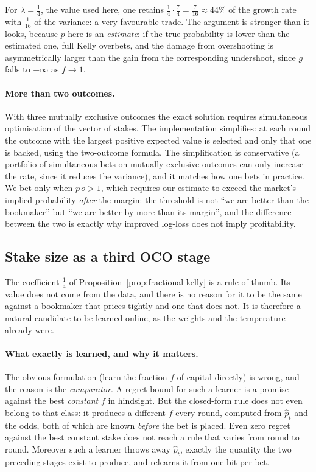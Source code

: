 \documentclass[12pt,a4paper,oneside]{report}
\renewcommand{\_}{\oldunderscore\allowbreak}
\theoremstyle{definition}
\theoremstyle{plain}
\theoremstyle{remark}
\begin{document}
For $\lambda=\tfrac14$, the value used here, one retains
$\tfrac14\cdot\tfrac74 = \tfrac{7}{16} \approx 44\%$ of the growth rate with $\tfrac{1}{16}$ of
the variance: a very favourable trade. The argument is stronger than it looks, because $p$ here
is an \emph{estimate}: if the true probability is lower than the estimated one, full Kelly
overbets, and the damage from overshooting is asymmetrically larger than the gain from the
corresponding undershoot, since $g$ falls to $-\infty$ as $f\to 1$.

\paragraph{More than two outcomes.} With three mutually exclusive outcomes the exact solution
requires simultaneous optimisation of the vector of stakes. The implementation simplifies: at
each round the outcome with the largest positive expected value is selected and only that one is
backed, using the two-outcome formula. The simplification is conservative (a portfolio of
simultaneous bets on mutually exclusive outcomes can only increase the rate, since it reduces
the variance), and it matches how one bets in practice. We bet only when $p\,o > 1$, which
requires our estimate to exceed the market's implied probability \emph{after} the margin: the
threshold is not ``we are better than the bookmaker'' but ``we are better by more than its
margin'', and the difference between the two is exactly why improved log-loss does not imply
profitability.

\subsection{Stake size as a third OCO stage}
\label{sec:oco-kelly-theory}

The coefficient $\tfrac14$ of Proposition~\ref{prop:fractional-kelly} is a rule of thumb. Its
value does not come from the data, and there is no reason for it to be the same against a
bookmaker that prices tightly and one that does not. It is therefore a natural candidate to be
learned online, as the weights and the temperature already were.

\paragraph{What exactly is learned, and why it matters.} The obvious formulation (learn the
fraction $f$ of capital directly) is wrong, and the reason is the \emph{comparator}. A regret
bound for such a learner is a promise against the best \emph{constant} $f$ in hindsight. But
the closed-form rule does not even belong to that class: it produces a different $f$ every
round, computed from $\hat{p}_t$ and the odds, both of which are known \emph{before} the bet is
placed. Even zero regret against the best constant stake does not reach a rule that varies from
round to round. Moreover such a learner throws away $\hat{p}_t$, exactly the quantity the two
preceding stages exist to produce, and relearns it from one bit per bet.
\end{document}
